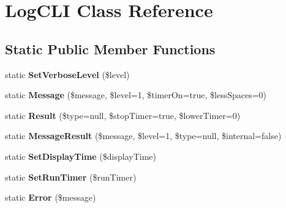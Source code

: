 \hypertarget{class_tools_1_1_log_c_l_i}{
\section{\-Log\-C\-L\-I \-Class \-Reference}
\label{class_tools_1_1_log_c_l_i}
}
\subsection*{\-Static \-Public \-Member \-Functions}
\begin{DoxyCompactItemize}
\item 
\hypertarget{class_tools_1_1_log_c_l_i_ad09f54254a1d37bd139b308cd3fc43bc}{
static {\bfseries \-Set\-Verbose\-Level} (\$level)}
\label{class_tools_1_1_log_c_l_i_ad09f54254a1d37bd139b308cd3fc43bc}

\item 
\hypertarget{class_tools_1_1_log_c_l_i_ac99e5cf14465a3ebc4741634de16b016}{
static {\bfseries \-Message} (\$message, \$level=1, \$timer\-On=true, \$less\-Spaces=0)}
\label{class_tools_1_1_log_c_l_i_ac99e5cf14465a3ebc4741634de16b016}

\item 
\hypertarget{class_tools_1_1_log_c_l_i_a6f1767607ca047b7a7ebcc3bb9061951}{
static {\bfseries \-Result} (\$type=null, \$stop\-Timer=true, \$lower\-Timer=0)}
\label{class_tools_1_1_log_c_l_i_a6f1767607ca047b7a7ebcc3bb9061951}

\item 
\hypertarget{class_tools_1_1_log_c_l_i_ac73d3bca6820a0e158b06ba39bff779a}{
static {\bfseries \-Message\-Result} (\$message, \$level=1, \$type=null, \$internal=false)}
\label{class_tools_1_1_log_c_l_i_ac73d3bca6820a0e158b06ba39bff779a}

\item 
\hypertarget{class_tools_1_1_log_c_l_i_aef73587dbe557264be2755f6788c41d3}{
static {\bfseries \-Set\-Display\-Time} (\$display\-Time)}
\label{class_tools_1_1_log_c_l_i_aef73587dbe557264be2755f6788c41d3}

\item 
\hypertarget{class_tools_1_1_log_c_l_i_ad8bc17a51912aff4900f630fbc1ee097}{
static {\bfseries \-Set\-Run\-Timer} (\$run\-Timer)}
\label{class_tools_1_1_log_c_l_i_ad8bc17a51912aff4900f630fbc1ee097}

\item 
\hypertarget{class_tools_1_1_log_c_l_i_a7b0bebeacbe25127b862f3c1acdf4dfc}{
static {\bfseries \-Error} (\$message)}
\label{class_tools_1_1_log_c_l_i_a7b0bebeacbe25127b862f3c1acdf4dfc}


\end{DoxyCompactItemize}
